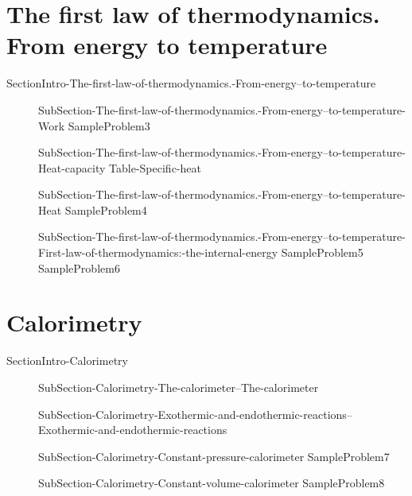 \documentclass[main.tex]{subfiles}
\begin{document}
\section{The first law of thermodynamics. From energy  to temperature}
{SectionIntro-The-first-law-of-thermodynamics.-From-energy--to-temperature}
\sloppy\begin{description}
\item[] 
  {SubSection-The-first-law-of-thermodynamics.-From-energy--to-temperature-Work}
   {SampleProblem3}
\item[] 
  {SubSection-The-first-law-of-thermodynamics.-From-energy--to-temperature-Heat-capacity}
   {Table-Specific-heat}
\item[] 
  {SubSection-The-first-law-of-thermodynamics.-From-energy--to-temperature-Heat}
   {SampleProblem4}
\item[] 
  {SubSection-The-first-law-of-thermodynamics.-From-energy--to-temperature-First-law-of-thermodynamics:-the-internal-energy}
   {SampleProblem5}
   {SampleProblem6}
\end{description}
\section{Calorimetry}
{SectionIntro-Calorimetry}
\sloppy\begin{description}
\item[] 
  {SubSection-Calorimetry-The-calorimeter--The-calorimeter}
\item[] 
    {SubSection-Calorimetry-Exothermic-and-endothermic-reactions--Exothermic-and-endothermic-reactions}
\item[] 
  {SubSection-Calorimetry-Constant-pressure-calorimeter}
   {SampleProblem7}
\item[] 
  {SubSection-Calorimetry-Constant-volume-calorimeter}
   {SampleProblem8}
\end{description}
     \hspace{-2cm}{Figure-Calorimeter}
\end{document}
